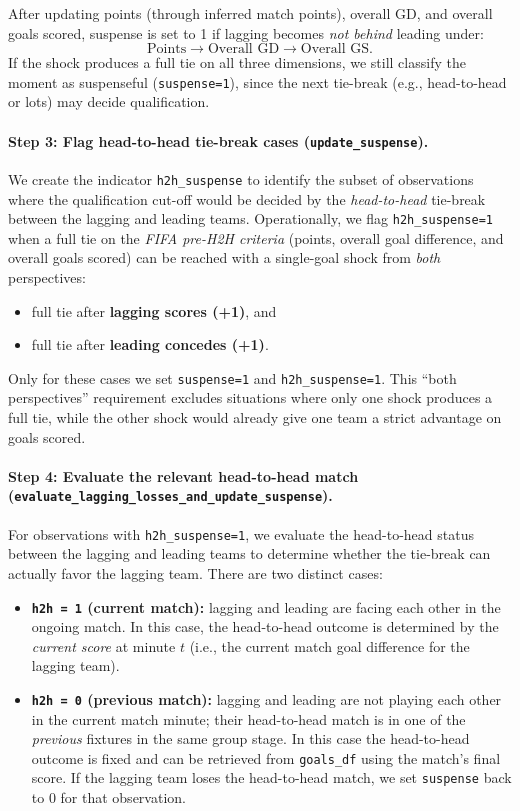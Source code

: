 \documentclass[11pt]{article}
\begin{document}
\noindent After updating points (through inferred match points), overall GD, and overall goals scored, suspense is set to 1 if lagging becomes \emph{not behind} leading under:
\[
\text{Points} \rightarrow \text{Overall GD} \rightarrow \text{Overall GS}.
\]
If the shock produces a full tie on all three dimensions, we still classify the moment as suspenseful (\texttt{suspense=1}), since the next tie-break (e.g., head-to-head or lots) may decide qualification.

\paragraph{Step 3: Flag head-to-head tie-break cases (\texttt{update\_suspense}).}
We create the indicator \texttt{h2h\_suspense} to identify the subset of observations where the qualification cut-off would be decided by the \emph{head-to-head} tie-break between the lagging and leading teams.
Operationally, we flag \texttt{h2h\_suspense=1} when a full tie on the \emph{FIFA pre-H2H criteria} (points, overall goal difference, and overall goals scored) can be reached with a single-goal shock from \emph{both} perspectives:
\begin{itemize}
    \item full tie after \textbf{lagging scores (+1)}, and
    \item full tie after \textbf{leading concedes (+1)}.
\end{itemize}
Only for these cases we set \texttt{suspense=1} and \texttt{h2h\_suspense=1}.
This ``both perspectives'' requirement excludes situations where only one shock produces a full tie, while the other shock would already give one team a strict advantage on goals scored.

\paragraph{Step 4: Evaluate the relevant head-to-head match (\texttt{evaluate\_lagging\_losses\_and\_update\_suspense}).}
For observations with \texttt{h2h\_suspense=1}, we evaluate the head-to-head status between the lagging and leading teams to determine whether the tie-break can actually favor the lagging team.
There are two distinct cases:
\begin{itemize}
    \item \textbf{\texttt{h2h = 1} (current match):} lagging and leading are facing each other in the ongoing match. In this case, the head-to-head outcome is determined by the \emph{current score} at minute $t$ (i.e., the current match goal difference for the lagging team).
    \item \textbf{\texttt{h2h = 0} (previous match):} lagging and leading are not playing each other in the current match minute; their head-to-head match is in one of the \emph{previous} fixtures in the same group stage. In this case the head-to-head outcome is fixed and can be retrieved from \texttt{goals\_df} using the match's final score. If the lagging team loses the head-to-head match, we set \texttt{suspense} back to 0 for that observation.
\end{itemize}
\end{document}
